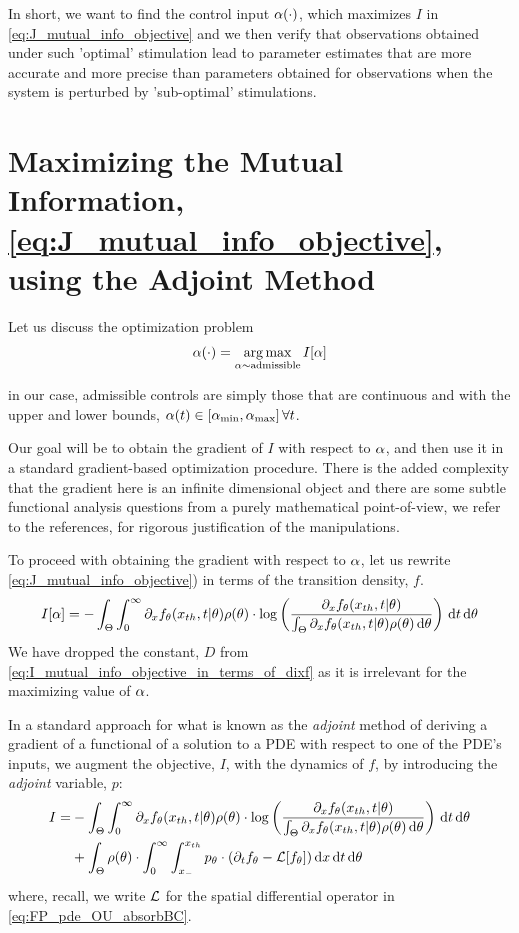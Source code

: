 \documentclass{article}
\begin{document}
In short, we want to find the control input ${\alpha}(\cdot)$, which maximizes $I$ in
\cref{eq:J_mutual_info_objective} and we then verify that observations obtained
under such 'optimal' stimulation lead to parameter estimates that are more
accurate and more precise than parameters obtained for observations when the
system is perturbed by 'sub-optimal' stimulations.

\section{Maximizing the Mutual Information,
\cref{eq:J_mutual_info_objective}, using the Adjoint Method}
\label{sec:maximizing_MI}
Let us discuss the optimization problem
$$
\a(\cdot) = \argmax_{\a \sim \textrm{admissible}} I[\a]
$$ 

in our case, admissible controls are simply those that are continuous and with
the upper and lower bounds, ${\alpha}(t) \in [{ {\alpha}_{\textrm{min}} }, { {\alpha}_{\textrm{max}} }] \,  \forall t$.

Our goal will be to obtain the gradient of $I$ with respect to ${\alpha}$, and then
use it in a standard gradient-based optimization procedure. There is the added
complexity that the gradient here is an infinite dimensional object and there
are some subtle functional analysis questions from a purely mathematical
point-of-view, we refer to the references, \cite{Lenhart2007,Borzi2012} for
rigorous justification of the manipulations. 

To proceed with obtaining the gradient with respect to ${\alpha}$, let us rewrite \cref{eq:J_mutual_info_objective}) in terms of the transition density, $f$. 
\begin{equation}
I[{\alpha}] = 
- \int_\Theta \int_0^\infty
	   {\partial}_xf_{\theta}({ x_{th} }, t|{\theta})  \rho({\theta}) \cdot 
		\log \left( \frac{{\partial}_xf_{\theta}({ x_{th} }, t|{\theta})}
						{\int_\Theta {\partial}_xf_{\theta}({ x_{th} }, t|{\theta})\rho({\theta})
\, \mathrm{d} {\theta} } \right)
\, \mathrm{d} t\, \mathrm{d} {\theta}
\label{eq:I_mutual_info_objective_in_terms_of_dixf} 
\end{equation}
We have dropped the constant, $D$ from
\cref{eq:I_mutual_info_objective_in_terms_of_dixf} as it is irrelevant for
the maximizing value of ${\alpha}$.

 In a standard approach for what
is known as the {\sl adjoint}  method of deriving a gradient of a
functional of a solution to a PDE with respect to one of the PDE's inputs, we
augment the objective, $I$, with the dynamics of $f$, by introducing the {\sl
adjoint} variable, $p$: 
\begin{align}
I=&  -
\int_\Theta \int_0^\infty 
	  {\partial}_xf_{\theta}({ x_{th} }, t|{\theta})  \rho({\theta}) \cdot 
		\log \left( \frac{{\partial}_xf_{\theta}({ x_{th} }, t|{\theta})}
						{\int_\Theta {\partial}_xf_{\theta}({ x_{th} }, t|{\theta})\rho({\theta})\, \mathrm{d} {\theta} } \right)
\, \mathrm{d} t\, \mathrm{d} {\theta} 
\\
	  &+ \int_\Theta  \rho({\theta}) \cdot \int_0^\infty \int_{x_-}^{{ x_{th} }}
	  		p_{\theta} \cdot ({\partial}_t f_{\theta} -	  { \mathcal{L} }[f_{\theta}]) 
  				\, \mathrm{d} x	  \, \mathrm{d} t \, \mathrm{d} {\theta}
	  \label{eq:adjoint_term_in_objective} 
\end{align}
where, recall, we write ${ \mathcal{L} }$ for the spatial differential operator in 
\cref{eq:FP_pde_OU_absorbBC}.
\end{document}
